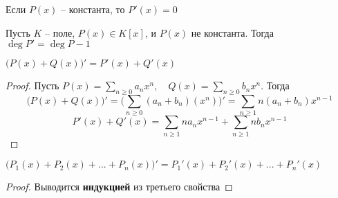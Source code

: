 \begin{props}
	\item Если $P(x)$ -- константа, то $P'(x) = 0$
	\item Пусть $K$ -- поле, $P(x) \in K[x]$, и $P(x)$ не константа. Тогда $ \deg P' = \deg P - 1 $
	\item $ \bigg( P(x) + Q(x) \bigg)' = P'(x) + Q'(x)$
	\begin{proof}
		Пусть $P(x) = \sum_{n \ge 0}a_nx^n, \quad Q(x) = \sum_{n \ge 0}b_nx^n$. Тогда
		$$ \bigg( P(x) + Q(x) \bigg)' = \bigg( \sum_{n \ge 0}(a_n + b_n)(x^n) \bigg)' = \sum_{n \ge 1}n(a_n + b_n)x^{n - 1} $$
		$$P'(x) + Q'(x) = \sum_{n \ge 1}na_nx^{n - 1} + \sum_{n \ge 1}nb_nx^{n - 1} $$
	\end{proof}

	\begin{implication}
		$ \bigg( P_1(x) + P_2(x) + ... + P_n(x) \bigg)' = P_1'(x) + P_2'(x) + ... + P_n'(x) $
	\end{implication}

	\begin{proof}
		Выводится \textbf{индукцией} из третьего свойства
	\end{proof}


\end{props}
